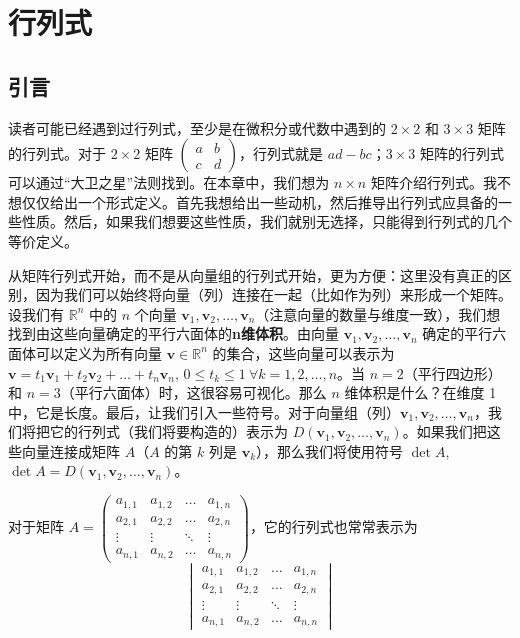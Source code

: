 
\chapter{行列式}

\section{引言}

读者可能已经遇到过行列式，至少是在微积分或代数中遇到的 $2 \times 2$ 和 $3 \times 3$ 矩阵的行列式。对于 $2 \times 2$ 矩阵 $\begin{pmatrix} a & b \\ c & d \end{pmatrix}$，行列式就是 $ad - bc$；$3 \times 3$ 矩阵的行列式可以通过“大卫之星”法则找到。在本章中，我们想为 $n \times n$ 矩阵介绍行列式。我不想仅仅给出一个形式定义。首先我想给出一些动机，然后推导出行列式应具备的一些性质。然后，如果我们想要这些性质，我们就别无选择，只能得到行列式的几个等价定义。

从矩阵行列式开始，而不是从向量组的行列式开始，更为方便：这里没有真正的区别，因为我们可以始终将向量（列）连接在一起（比如作为列）来形成一个矩阵。设我们有 $\mathbb{R}^n$ 中的 $n$ 个向量 $\mathbf{v}_1, \mathbf{v}_2, \dots, \mathbf{v}_n$（注意向量的数量与维度一致），我们想找到由这些向量确定的平行六面体的\textbf{n维体积}。由向量 $\mathbf{v}_1, \mathbf{v}_2, \dots, \mathbf{v}_n$ 确定的平行六面体可以定义为所有向量 $\mathbf{v} \in \mathbb{R}^n$ 的集合，这些向量可以表示为 $\mathbf{v} = t_1 \mathbf{v}_1 + t_2 \mathbf{v}_2 + \dots + t_n \mathbf{v}_n$, $0 \le t_k \le 1 \ \forall k = 1, 2, \dots, n$。当 $n=2$（平行四边形）和 $n=3$（平行六面体）时，这很容易可视化。那么 $n$ 维体积是什么？在维度 1 中，它是长度。最后，让我们引入一些符号。对于向量组（列）$\mathbf{v}_1, \mathbf{v}_2, \dots, \mathbf{v}_n$，我们将把它的行列式（我们将要构造的）表示为 $D(\mathbf{v}_1, \mathbf{v}_2, \dots, \mathbf{v}_n)$。如果我们把这些向量连接成矩阵 $A$（$A$ 的第 $k$ 列是 $\mathbf{v}_k$），那么我们将使用符号 $\det A$, $\det A = D(\mathbf{v}_1, \mathbf{v}_2, \dots, \mathbf{v}_n)$。

对于矩阵 $A = \begin{pmatrix} a_{1,1} & a_{1,2} & \dots & a_{1,n} \\ a_{2,1} & a_{2,2} & \dots & a_{2,n} \\ \vdots & \vdots & \ddots & \vdots \\ a_{n,1} & a_{n,2} & \dots & a_{n,n} \end{pmatrix}$，它的行列式也常常表示为
$$
\begin{vmatrix}
a_{1,1} & a_{1,2} & \dots & a_{1,n} \\
a_{2,1} & a_{2,2} & \dots & a_{2,n} \\
\vdots & \vdots & \ddots & \vdots \\
a_{n,1} & a_{n,2} & \dots & a_{n,n}
\end{vmatrix}
$$

